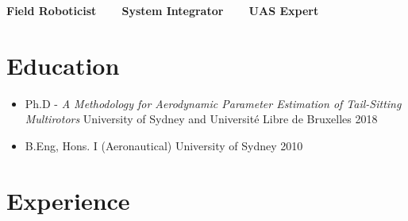 \documentclass[12pt,letter,sans]{moderncv}        %
\begin{document}
\makecvtitle 
\vspace{-26pt}
\begin{center}
	\textbf{Field Roboticist~~~~System Integrator~~~~UAS Expert}
\end{center}



\section{Education}

\vspace{4pt}

\begin{itemize}

\item{
    \cventry
    {}
    {Ph.D - \textit{A Methodology for Aerodynamic Parameter Estimation of Tail-Sitting Multirotors}}
    {University of Sydney and Universit\'e Libre de Bruxelles}    
    {2018}    
    {} 
    {}
}

\item{
    \cventry
    {}
    {B.Eng, Hons. I (Aeronautical)}
    {University of Sydney}
    {2010}
    {}
    {}
}

\end{itemize}

\vspace{2pt}


\section{Experience}

\vspace{4pt}
\end{document}

